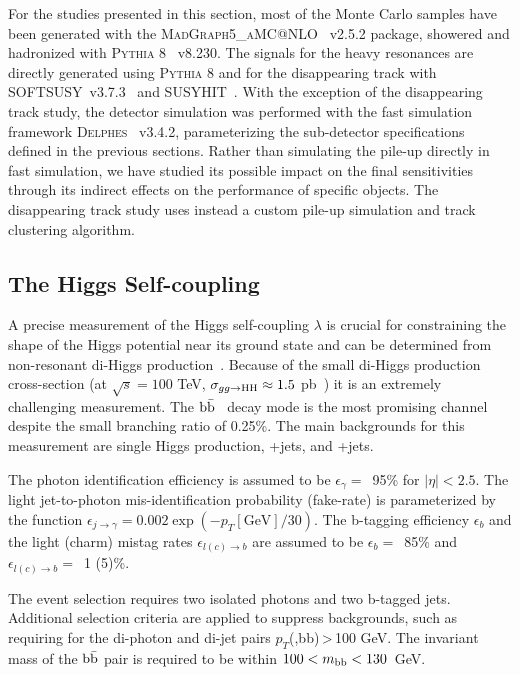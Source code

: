 \documentclass[11pt,twoside,a4paper]{cernrep}
\newcommand*{\effg}{\ensuremath{\epsilon_{\gamma}}}
\newcommand*{\misg}{\ensuremath{\epsilon_{j \rightarrow \gamma}}}
\newcommand*{\effb}{\ensuremath{\epsilon_{b}}}
\newcommand*{\mislc}{\ensuremath{\epsilon_{l(c) \rightarrow b}}}
\begin{document}
For the studies presented in this section, most of the Monte Carlo samples have been generated with the \textsc{MadGraph5\_aMC@NLO}~\cite{Alwall:2014hca} v2.5.2 package, showered and hadronized with \textsc{Pythia 8}~\cite{Sjostrand:2007gs} v8.230. The signals for the heavy resonances are directly generated using \textsc{Pythia 8} and for the disappearing track with {\scshape SOFTSUSY}~v3.7.3~\cite{Allanach:2001kg} and {\scshape SUSYHIT}~\cite{Djouadi:2006bz}.
With the exception of the disappearing track study, the detector simulation was performed with the fast simulation framework \textsc{Delphes}~\cite{deFavereau:2013fsa} v3.4.2, parameterizing  the sub-detector specifications defined in the previous sections. Rather than simulating the pile-up directly in fast simulation, we have studied its possible impact on the final sensitivities through its indirect effects on the performance of specific objects. The disappearing track study uses instead a custom pile-up simulation and track clustering algorithm.

\subsection{The Higgs Self-coupling}
A precise measurement of the Higgs self-coupling $\lambda$ is crucial for constraining the shape of the Higgs potential near its ground state and can be determined from non-resonant di-Higgs production~\cite{Baglio:2012np}. Because of the small di-Higgs production cross-section (at $\sqrt{s} {=}100$ TeV, $\sigma_{gg\to {\rm HH}} \approx 1.5$ pb~\cite{Contino:2016spe}) it is an extremely challenging measurement. The $\rm b\bar{b}$\textgamma\textgamma~ decay mode is the most promising channel despite the small branching ratio of 0.25\%. The main backgrounds for this measurement are single Higgs production, \textgamma\textgamma+jets, and \textgamma+jets.

The photon identification efficiency is assumed to be $\effg=$~95\% for $|\eta| < 2.5$. The light jet-to-photon mis-identification probability (fake-rate) is parameterized by the function $\misg = 0.002 \exp(-p_T[\mathrm{GeV}]/30)$. The b-tagging efficiency $\effb$ and the light (charm) mistag rates $\mislc$ are assumed to be $\effb=$~85\% and $\mislc=$~1 (5)\%.

The event selection requires two isolated photons and two b-tagged jets. Additional selection criteria are applied to suppress backgrounds, such as requiring for the di-photon and di-jet pairs $p_T$(\textgamma\textgamma,bb)\,>\,100 GeV. The invariant mass of the $\rm b\bar{b}$ pair is required to be within \mbox{$100 <m_{\rm bb} < 130$ GeV}.
\end{document}
